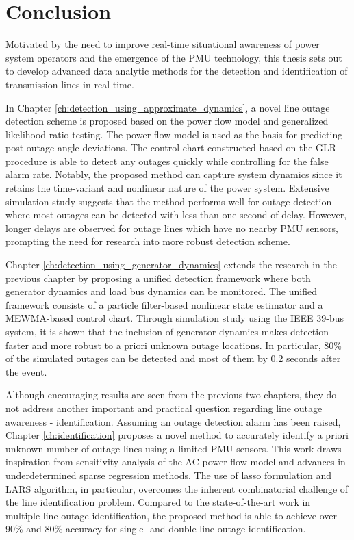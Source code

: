 \chapter{Conclusion}
\label{ch:conclusion}

Motivated by the need to improve real-time situational awareness of power system operators and the emergence of the PMU technology, this thesis sets out to develop advanced data analytic methods for the detection and identification of transmission lines in real time. 

In Chapter \ref{ch:detection_using_approximate_dynamics}, a novel line outage detection scheme is proposed based on the power flow model and generalized likelihood ratio testing. The power flow model is used as the basis for predicting post-outage angle deviations. The control chart constructed based on the GLR procedure is able to detect any outages quickly while controlling for the false alarm rate. Notably, the proposed method can capture system dynamics since it retains the time-variant and nonlinear nature of the power system. Extensive simulation study suggests that the method performs well for outage detection where most outages can be detected with less than one second of delay. However, longer delays are observed for outage lines which have no nearby PMU sensors, prompting the need for research into more robust detection scheme. 

Chapter \ref{ch:detection_using_generator_dynamics} extends the research in the previous chapter by proposing a unified detection framework where both generator dynamics and load bus dynamics can be monitored. The unified framework consists of a particle filter-based nonlinear state estimator and a MEWMA-based control chart. Through simulation study using the IEEE 39-bus system, it is shown that the inclusion of generator dynamics makes detection faster and more robust to a priori unknown outage locations. In particular, 80\% of the simulated outages can be detected and most of them by 0.2 seconds after the event. 

Although encouraging results are seen from the previous two chapters, they do not address another important and practical question regarding line outage awareness - identification. Assuming an outage detection alarm has been raised, Chapter \ref{ch:identification} proposes a novel method to accurately identify a priori unknown number of outage lines using a limited PMU sensors. This work draws inspiration from sensitivity analysis of the AC power flow model and advances in underdetermined sparse regression methods. The use of lasso formulation and LARS algorithm, in particular, overcomes the inherent combinatorial challenge of the line identification problem. Compared to the state-of-the-art work in multiple-line outage identification, the proposed method is able to achieve over 90\% and 80\% accuracy for single- and double-line outage identification. 

